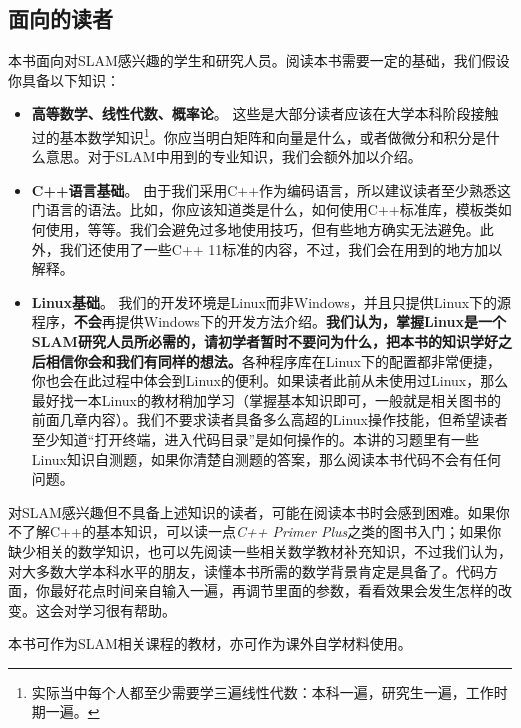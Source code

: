 \subsection{面向的读者}
本书面向对SLAM感兴趣的学生和研究人员。阅读本书需要一定的基础，我们假设你具备以下知识：

\begin{itemize}
\item {\textbf{高等数学、线性代数、概率论}。} 这些是大部分读者应该在大学本科阶段接触过的基本数学知识\footnote{实际当中每个人都至少需要学三遍线性代数：本科一遍，研究生一遍，工作时期一遍。}。你应当明白矩阵和向量是什么，或者做微分和积分是什么意思。对于SLAM中用到的专业知识，我们会额外加以介绍。

\item {\textbf{C++语言基础}。} 由于我们采用C++作为编码语言，所以建议读者至少熟悉这门语言的语法。比如，你应该知道类是什么，如何使用C++标准库，模板类如何使用，等等。我们会避免过多地使用技巧，但有些地方确实无法避免。此外，我们还使用了一些C++ 11标准的内容，不过，我们会在用到的地方加以解释。

\item {\textbf{Linux基础}。} 我们的开发环境是Linux而非Windows，并且只提供Linux下的源程序，\textbf{不会}再提供Windows下的开发方法介绍。\textbf{我们认为，掌握Linux是一个SLAM研究人员所必需的，请初学者暂时不要问为什么，把本书的知识学好之后相信你会和我们有同样的想法。}各种程序库在Linux下的配置都非常便捷，你也会在此过程中体会到Linux的便利。如果读者此前从未使用过Linux，那么最好找一本Linux的教材稍加学习（掌握基本知识即可，一般就是相关图书的前面几章内容）。我们不要求读者具备多么高超的Linux操作技能，但希望读者至少知道“打开终端，进入代码目录”是如何操作的。本讲的习题里有一些Linux知识自测题，如果你清楚自测题的答案，那么阅读本书代码不会有任何问题。
\end{itemize}

对SLAM感兴趣但不具备上述知识的读者，可能在阅读本书时会感到困难。如果你不了解C++的基本知识，可以读一点\emph{C++ Primer Plus}之类的图书入门；如果你缺少相关的数学知识，也可以先阅读一些相关数学教材补充知识，不过我们认为，对大多数大学本科水平的朋友，读懂本书所需的数学背景肯定是具备了。代码方面，你最好花点时间亲自输入一遍，再调节里面的参数，看看效果会发生怎样的改变。这会对学习很有帮助。

本书可作为SLAM相关课程的教材，亦可作为课外自学材料使用。

